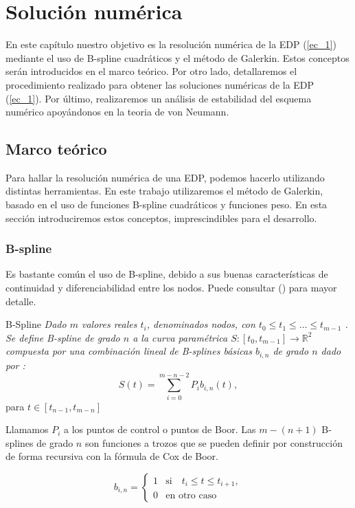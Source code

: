 \chapter{Solución numérica}
\label{cha:segunda}

 En este capítulo nuestro objetivo es la resolución numérica de la EDP (\ref{ec_1}) mediante el uso de B-spline cuadráticos y el método de Galerkin. Estos conceptos serán introducidos en el marco teórico. Por otro lado, detallaremos el procedimiento realizado para obtener las soluciones numéricas de la EDP (\ref{ec_1}). Por último, realizaremos un análisis de estabilidad del esquema numérico apoyándonos en la teoria de von Neumann.

\section{Marco teórico}

Para hallar la resolución numérica de una EDP, podemos hacerlo utilizando distintas herramientas. En este trabajo utilizaremos el método de Galerkin, basado en el uso de funciones B-spline cuadráticos y funciones peso. En esta sección introduciremos estos conceptos, imprescindibles para el desarrollo.

\subsection{B-spline}

Es bastante común el uso de B-spline, debido a sus buenas características de continuidad y diferenciabilidad entre los nodos. Puede consultar (\cite{prenter9}) para mayor detalle.

\begin{definicion1}[label={definicion},nameref={Title or anything else}]{B-Spline}
    \textit{Dado $m$ valores reales $t_{i}$, denominados nodos, con $t_{0}\leq t_{1} \leq \dots \leq t_{m-1}$ . Se define B-spline de grado $n$ a la curva paramétrica $ S:[t_{0},t_{m-1}] \rightarrow \mathbb R^{2} $ compuesta por una combinación lineal de B-splines básicas $b_{i,n}$ de grado $n$ dado por :}
    $$S(t)=\sum_{i=0}^{m-n-2}P_{i}b_{i,n}(t),$$
    para $t\in [t_{n-1},t_{m-n}]$
\end{definicion1}
Llamamos $P_{i}$ a los puntos de control o puntos de Boor.
Las $m-(n+1)$ B-splines de grado $n$ son funciones a trozos que se pueden definir por construcción de forma recursiva con la fórmula de Cox de Boor.

$$b_{i,n}=\left\{\begin{matrix}
            1 & \text{si} \quad t_{i}\leq t \leq t_{i+1},\\ 
            0 & \text{en otro caso}
\end{matrix}\right.$$
    
